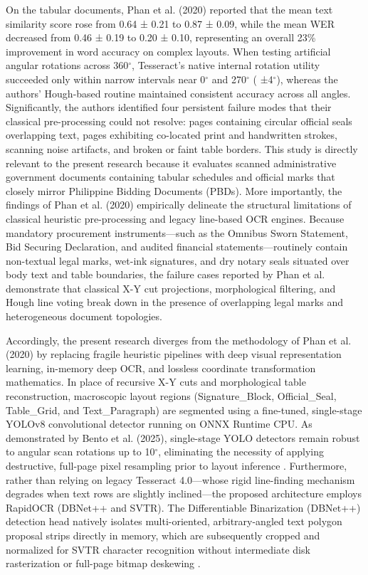 On the tabular documents, Phan et al. (2020) reported that the mean text similarity score rose from 0.64 ± 0.21 to 0.87 ± 0.09, while the mean WER decreased from 0.46 ± 0.19 to 0.20 ± 0.10, representing an overall 23\% improvement in word accuracy on complex layouts.
When testing artificial angular rotations across 360$^\circ$, Tesseract’s native internal rotation utility succeeded only within narrow intervals near 0$^\circ$  and 270$^\circ$ ( ±4$^\circ$), whereas the authors' Hough-based routine maintained consistent accuracy across all angles.
Significantly, the authors identified four persistent failure modes that their classical pre-processing could not resolve: pages containing circular official seals overlapping text, pages exhibiting co-located print and handwritten strokes, scanning noise artifacts, and broken or faint table borders.
This study is directly relevant to the present research because it evaluates scanned administrative government documents containing tabular schedules and official marks that closely mirror Philippine Bidding Documents (PBDs).
More importantly, the findings of Phan et al. (2020) empirically delineate the structural limitations of classical heuristic pre-processing and legacy line-based OCR engines.
Because mandatory procurement instruments—such as the Omnibus Sworn Statement, Bid Securing Declaration, and audited financial statements—routinely contain non-textual legal marks, wet-ink signatures, and dry notary seals situated over body text and table boundaries, the failure cases reported by Phan et al. demonstrate that classical X-Y cut projections, morphological filtering, and Hough line voting break down in the presence of overlapping legal marks and heterogeneous document topologies.

Accordingly, the present research diverges from the methodology of Phan et al. (2020) by replacing fragile heuristic pipelines with deep visual representation learning, in-memory deep OCR, and lossless coordinate transformation mathematics.
In place of recursive X-Y cuts and morphological table reconstruction, macroscopic layout regions (Signature\_Block, Official\_Seal, Table\_Grid, and Text\_Paragraph) are segmented using a fine-tuned, single-stage YOLOv8 convolutional detector running on ONNX Runtime CPU.
As demonstrated by Bento et al. (2025), single-stage YOLO detectors remain robust to angular scan rotations up to 10$^\circ$, eliminating the necessity of applying destructive, full-page pixel resampling prior to layout inference \cite{ref49}.
Furthermore, rather than relying on legacy Tesseract 4.0—whose rigid line-finding mechanism degrades when text rows are slightly inclined—the proposed architecture employs RapidOCR (DBNet++ and SVTR).
The Differentiable Binarization (DBNet++) detection head natively isolates multi-oriented, arbitrary-angled text polygon proposal strips directly in memory, which are subsequently cropped and normalized for SVTR character recognition without intermediate disk rasterization or full-page bitmap deskewing \cite{ref52}.

